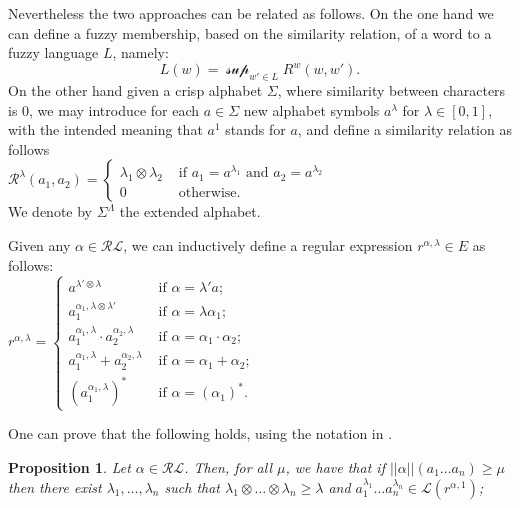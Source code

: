 \documentclass{article}
\def\ie{{\em i.e. }}
\newtheorem{proposition}{Proposition}[section]
\begin{document}
Nevertheless the two approaches can be related as follows. On the one hand we can define a fuzzy membership, based on the similarity relation, of a word to a fuzzy language $L$, namely:
\[ L(w)= \mathcal \sup_{w'\in L}R^w(w,w').\]
On the other hand given a crisp alphabet $\Sigma$, where similarity between characters is 0, we may introduce for each $a\in \Sigma$ new alphabet symbols $a^\lambda$ for $\lambda\in [0,1]$, with the intended meaning that $a^1$ stands for $a$, and define a similarity relation as follows\\
$\mathcal R^\lambda(a_1,a_2)=\begin{cases} \lambda_1 \otimes \lambda_2& \mbox{ if } a_1=a^{\lambda_1} \mbox{ and } a_2=a^{\lambda_2} \\
                                                           0 & \mbox{ otherwise.}
\end{cases}$\\ We denote by $\Sigma^\Lambda$ the extended alphabet.

Given any $\alpha \in \mathcal R \mathcal L$, we can inductively define a regular expression $r^{\alpha,\lambda}\in E$ as follows:\\
$r^{\alpha,\lambda}=\begin{cases} a^{\lambda'\otimes \lambda} & \mbox{ if } \alpha=\lambda' a;\\
 a_1^{\alpha_1,\lambda\otimes \lambda'} & \mbox{ if } \alpha=\lambda \alpha_1;\\
 a_1^{\alpha_1,\lambda}\cdot a_2^{\alpha_2,\lambda} & \mbox{ if } \alpha=\alpha_1 \cdot \alpha_2;\\
 a_1^{\alpha_1,\lambda}+ a_2^{\alpha_2,\lambda} & \mbox{ if } \alpha=\alpha_1 + \alpha_2;\\
 (a_1^{\alpha_1,\lambda})^* & \mbox{ if } \alpha= ( \alpha_1)^*.
\end{cases}$

One can prove that the following holds, using the notation in \cite{SC12}.
\begin{proposition} Let $\alpha \in \mathcal R \mathcal L$. Then, for all $\mu$, we have that if $||\alpha ||(a_1\ldots a_n)\geq \mu$ then there exist $\lambda_1,\ldots, \lambda_n$ such that $\lambda_1\otimes \ldots \otimes \lambda_n\geq \lambda$ and $a_1^{\lambda_1}\ldots a_n^{\lambda_n}\in \mathcal L(r^{\alpha,1})$;
\end{proposition}
\end{document}
